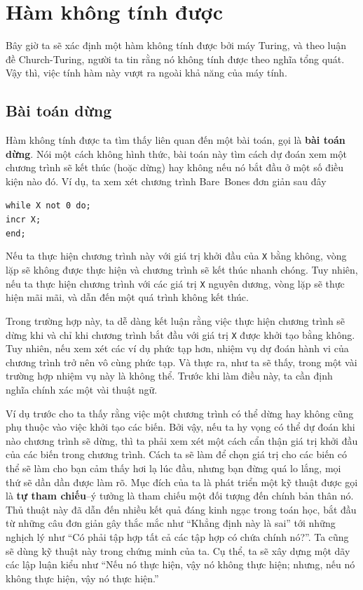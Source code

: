 \section{Hàm không tính được}
\label{sec:114}
Bây giờ ta sẽ xác định một hàm không tính được bởi máy Turing, và theo luận đề
Church-Turing, người ta tin rằng nó không tính được theo nghĩa tổng quát. Vậy thì, việc
tính hàm này vượt ra ngoài khả năng của máy tính.

\subsection*{Bài toán dừng}

Hàm không tính được ta tìm thấy liên quan đến một bài toán, gọi là \textbf{bài toán
  dừng}. Nói một cách không hình thức, bài toán này tìm cách dự đoán xem một chương trình
sẽ kết thúc (hoặc dừng) hay không nếu nó bắt đầu ở một số điều kiện nào đó. Ví dụ, ta xem
xét chương trình Bare~Bones đơn giản sau đây
\begin{flushleft}
  \qquad \qquad\qquad \texttt{while X not 0 do;} \\
  \qquad \qquad\qquad \quad \texttt{incr X;} \\
  \qquad\qquad\qquad\texttt{end;}
\end{flushleft}
Nếu ta thực hiện chương trình này với giá trị khởi đầu của \texttt{X} bằng không, vòng lặp
sẽ không được thực hiện và chương trình sẽ kết thúc nhanh chóng. Tuy nhiên, nếu ta thực
hiện chương trình với các giá trị \texttt{X} nguyên dương, vòng lặp sẽ thực hiện mãi mãi,
và dẫn đến một quá trình không kết thúc.

Trong trường hợp này, ta dễ dàng kết luận rằng việc thực hiện chương trình sẽ dừng khi và
chỉ khi chương trình bắt đầu với giá trị \texttt{X} được khởi tạo bằng không. Tuy nhiên,
nếu xem xét các ví dụ phức tạp hơn, nhiệm vụ dự đoán hành vi của chương trình trở nên vô
cùng phức tạp. Và thực ra, như ta sẽ thấy, trong một vài trường hợp nhiệm vụ này là không
thể. Trước khi làm điều này, ta cần định nghĩa chính xác một vài thuật ngữ.

Ví dụ trước cho ta thấy rằng việc một chương trình có thể dừng hay không cũng phụ thuộc
vào việc khởi tạo các biến. Bởi vậy, nếu ta hy vọng có thể dự đoán khi nào chương trình sẽ
dừng, thì ta phải xem xét một cách cẩn thận giá trị khởi đầu của các biến trong chương
trình. Cách ta sẽ làm để chọn giá trị cho các biến có thể sẽ làm cho bạn cảm thấy hơi lạ
lúc đầu, nhưng bạn đừng quá lo lắng, mọi thứ sẽ dần dần được làm rõ. Mục đích của ta là
phát triển một kỹ thuật được gọi là \textbf{tự tham chiếu}--ý tưởng là tham chiếu một đối
tượng đến chính bản thân nó. Thủ thuật này đã dẫn đến nhiều kết quả đáng kinh ngạc trong
toán học, bắt đầu từ những câu đơn giản gây thắc mắc như ``Khẳng định này là sai'' tới
những nghịch lý như ``Có phải tập hợp tất cả các tập hợp có chứa chính nó?''. Ta cũng sẽ
dùng kỹ thuật này trong chứng minh của ta. Cụ thể, ta sẽ xây dựng một dãy các lập luận
kiểu như ``Nếu nó thực hiện, vậy nó không thực hiện; nhưng, nếu nó không thực hiện, vậy nó
thực hiện.''

